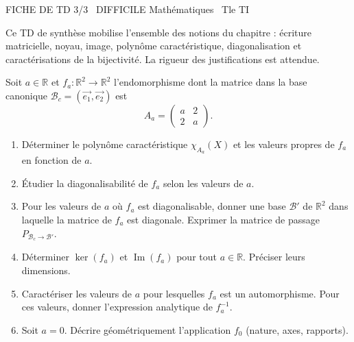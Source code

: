 \documentclass[11pt]{article}
\begin{document}
\begin{tcolorbox}[enhanced,colback=popink,colframe=popink,arc=10pt,boxrule=0pt,left=12pt,right=12pt,top=9pt,bottom=9pt]
{\color{white}\popxbold\small FICHE DE TD 3/3 \textbullet\ DIFFICILE \hfill Mathématiques \textbullet\ Tle TI\par}
\end{tcolorbox}
\vspace{4pt}
Ce TD de synthèse mobilise l'ensemble des notions du chapitre : écriture matricielle, noyau, image, polynôme caractéristique, diagonalisation et caractérisations de la bijectivité. La rigueur des justifications est attendue.

\begin{exercice}
Soit $a \in \mathbb{R}$ et $f_a : \mathbb{R}^2 \to \mathbb{R}^2$ l'endomorphisme dont la matrice dans la base canonique $\mathcal{B}_c = (\vec{e_1}, \vec{e_2})$ est 
$$A_a = \begin{pmatrix} a & 2 \\ 2 & a \end{pmatrix}.$$
\begin{enumerate}
    \item Déterminer le polynôme caractéristique $\chi_{A_a}(X)$ et les valeurs propres de $f_a$ en fonction de $a$.
    \item Étudier la diagonalisabilité de $f_a$ selon les valeurs de $a$. 
    \item Pour les valeurs de $a$ où $f_a$ est diagonalisable, donner une base $\mathcal{B}'$ de $\mathbb{R}^2$ dans laquelle la matrice de $f_a$ est diagonale. Exprimer la matrice de passage $P_{\mathcal{B}_c \to \mathcal{B}'}$.
    \item Déterminer $\ker(f_a)$ et $\operatorname{Im}(f_a)$ pour tout $a \in \mathbb{R}$. Préciser leurs dimensions.
    \item Caractériser les valeurs de $a$ pour lesquelles $f_a$ est un automorphisme. Pour ces valeurs, donner l'expression analytique de $f_a^{-1}$.
    \item Soit $a=0$. Décrire géométriquement l'application $f_0$ (nature, axes, rapports).
\end{enumerate}
\end{exercice}
\end{document}
